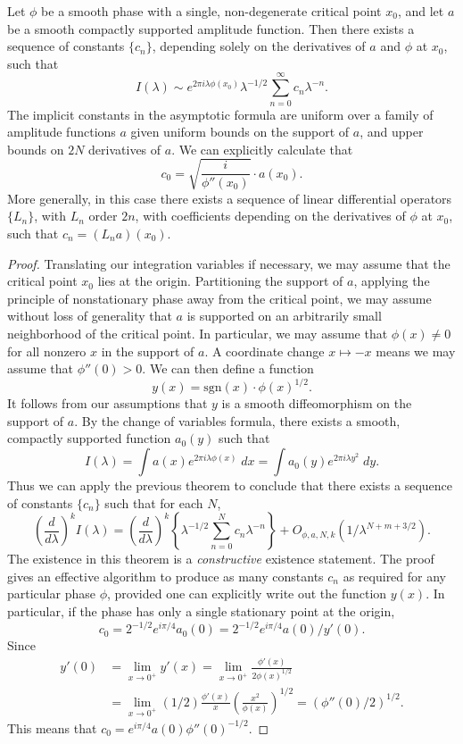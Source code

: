 \begin{theorem}
  Let $\phi$ be a smooth phase with a single, non-degenerate critical point $x_0$, and let $a$ be a smooth compactly supported amplitude function. Then there exists a sequence of constants $\{ c_n \}$, depending solely on the derivatives of $a$ and $\phi$ at $x_0$, such that
  \[ I(\lambda) \sim e^{2 \pi i \lambda \phi(x_0)} \lambda^{-1/2} \sum_{n = 0}^\infty c_n \lambda^{-n}. \]
  The implicit constants in the asymptotic formula are uniform over a family of amplitude functions $a$ given uniform bounds on the support of $a$, and upper bounds on $2N$ derivatives of $a$. We can explicitly calculate that
  \[ c_0 = \sqrt{ \frac{i}{\phi''(x_0)} } \cdot a(x_0). \]
  More generally, in this case there exists a sequence of linear differential operators $\{ L_n \}$, with $L_n$ order $2n$, with coefficients depending on the derivatives of $\phi$ at $x_0$, such that $c_n = (L_n a)(x_0)$.
\end{theorem}
\begin{proof}
    Translating our integration variables if necessary, we may assume that the critical point $x_0$ lies at the origin. Partitioning the support of $a$, applying the principle of nonstationary phase away from the critical point, we may assume without loss of generality that $a$ is supported on an arbitrarily small neighborhood of the critical point. In particular, we may assume that $\phi(x) \neq 0$ for all nonzero $x$ in the support of $a$. A coordinate change $x \mapsto -x$ means we may assume that $\phi''(0) > 0$. We can then define a function
  \[ y(x) = \text{sgn}(x) \cdot \phi(x)^{1/2}. \]
  It follows from our assumptions that $y$ is a smooth diffeomorphism on the support of $a$. By the change of variables formula, there exists a smooth, compactly supported function $a_0(y)$ such that
  \[ I(\lambda) = \int a(x) e^{2 \pi i \lambda \phi(x)}\; dx = \int a_0(y) e^{2 \pi i \lambda y^2}\; dy. \]
  Thus we can apply the previous theorem to conclude that there exists a sequence of constants $\{ c_n \}$ such that for each $N$,
  \[ \left( \frac{d}{d\lambda} \right)^k I(\lambda) = \left( \frac{d}{d\lambda} \right)^k \left\{ \lambda^{-1/2} \sum_{n = 0}^N c_n \lambda^{-n} \right\} + O_{\phi,a,N,k}(1/\lambda^{N+m+3/2}). \]
  The existence in this theorem is a \emph{constructive} existence statement. The proof gives an effective algorithm to produce as many constants $c_n$ as required for any particular phase $\phi$, provided one can explicitly write out the function $y(x)$. In particular, if the phase has only a single stationary point at the origin,
  \[ c_0 = 2^{-1/2} e^{i\pi/4} a_0(0) = 2^{-1/2} e^{i\pi/4} a(0) / y'(0). \]
  Since
  \begin{align*}
    y'(0) &= \lim_{x \to 0^+} y'(x) = \lim_{x \to 0^+} \frac{\phi'(x)}{2 \phi(x)^{1/2}}\\
    &= \lim_{x \to 0^+} (1/2) \frac{\phi'(x)}{x} \left( \frac{x^2}{\phi(x)} \right)^{1/2} = (\phi''(0)/2)^{1/2}.
  \end{align*}
  This means that $c_0 = e^{i\pi/4} a(0) \phi''(0)^{-1/2}$.
\end{proof}

